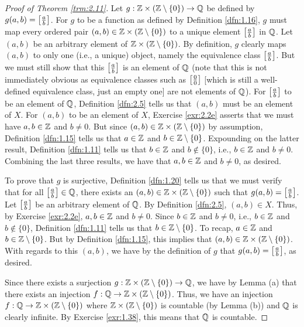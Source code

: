 \documentclass[../main.tex]{subfiles}
\begin{document}
\begin{theorem}
\begin{proof}[Proof of Theorem \ref{trm:2.11}]
        Let $g:\mathbb{Z}\times(\mathbb{Z}\setminus\{0\})\to\mathbb{Q}$ be defined by $g(a,b)=\left[ \frac{a}{b} \right]$. For $g$ to be a function as defined by Definition \ref{dfn:1.16}, $g$ must map every ordered pair $(a,b)\in\mathbb{Z}\times(\mathbb{Z}\setminus\{0\})$ to a unique element $\left[ \frac{a}{b} \right]$ in $\mathbb{Q}$. Let $(a,b)$ be an arbitrary element of $\mathbb{Z}\times(\mathbb{Z}\setminus\{0\})$. By definition, $g$ clearly maps $(a,b)$ to only one (i.e., a unique) object, namely the equivalence class $\left[ \frac{a}{b} \right]$. But we must still show that this $\left[ \frac{a}{b} \right]$ is an element of $\mathbb{Q}$ (note that this is not immediately obvious as equivalence classes such as $\left[ \frac{0}{0} \right]$ [which is still a well-defined equivalence class, just an empty one] are not elements of $\mathbb{Q}$). For $\left[ \frac{a}{b} \right]$ to be an element of $\mathbb{Q}$, Definition \ref{dfn:2.5} tells us that $(a,b)$ must be an element of $X$. For $(a,b)$ to be an element of $X$, Exercise \ref{exr:2.2e} asserts that we must have $a,b\in\mathbb{Z}$ and $b\neq 0$. But since $(a,b)\in\mathbb{Z}\times(\mathbb{Z}\setminus\{0\})$ by assumption, Definition \ref{dfn:1.15} tells us that $a\in\mathbb{Z}$ and $b\in\mathbb{Z}\setminus\{0\}$. Expounding on the latter result, Definition \ref{dfn:1.11} tells us that $b\in\mathbb{Z}$ and $b\notin\{0\}$, i.e., $b\in\mathbb{Z}$ and $b\neq 0$. Combining the last three results, we have that $a,b\in\mathbb{Z}$ and $b\neq 0$, as desired.\par
        To prove that $g$ is surjective, Definition \ref{dfn:1.20} tells us that we must verify that for all $\left[ \frac{a}{b} \right]\in\mathbb{Q}$, there exists an $(a,b)\in\mathbb{Z}\times(\mathbb{Z}\setminus\{0\})$ such that $g(a,b)=\left[ \frac{a}{b} \right]$. Let $\left[ \frac{a}{b} \right]$ be an arbitrary element of $\mathbb{Q}$. By Definition \ref{dfn:2.5}, $(a,b)\in X$. Thus, by Exercise \ref{exr:2.2e}, $a,b\in\mathbb{Z}$ and $b\neq 0$. Since $b\in\mathbb{Z}$ and $b\neq 0$, i.e., $b\in\mathbb{Z}$ and $b\notin\{0\}$, Definition \ref{dfn:1.11} tells us that $b\in\mathbb{Z}\setminus\{0\}$. To recap, $a\in\mathbb{Z}$ and $b\in\mathbb{Z}\setminus\{0\}$. But by Definition \ref{dfn:1.15}, this implies that $(a,b)\in\mathbb{Z}\times(\mathbb{Z}\setminus\{0\})$. With regards to this $(a,b)$, we have by the definition of $g$ that $g(a,b)=\left[ \frac{a}{b} \right]$, as desired.\par
        Since there exists a surjection $g:\mathbb{Z}\times(\mathbb{Z}\setminus\{0\})\to\mathbb{Q}$, we have by Lemma (a) that there exists an injection $f:\mathbb{Q}\to\mathbb{Z}\times(\mathbb{Z}\setminus\{0\})$. Thus, we have an injection $f:\mathbb{Q}\to\mathbb{Z}\times(\mathbb{Z}\setminus\{0\})$ where $\mathbb{Z}\times(\mathbb{Z}\setminus\{0\})$ is countable (by Lemma (b)) and $\mathbb{Q}$ is clearly infinite. By Exercise \ref{exr:1.38}, this means that $\mathbb{Q}$ is countable.
    \end{proof}
\end{theorem}
\end{document}
